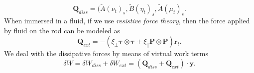 \documentclass[12pt]{article}
\begin{document}
\[
\mathbf{Q}_{diss}= (\tilde{A}(\nu_t)_s,\tilde{B}(\eta_t)_s,\tilde{A}(\mu_t)_s.
\]
When immersed in a fluid, if we use \emph{resistive force theory},
then the force applied by fluid on the rod can be modeled as
\[\mathbf{Q}_{ext} = -( \xi_\perp \mathbf{\tau}\otimes\mathbf{\tau} + \xi_\parallel \mathbf{P}\otimes \mathbf{P}) \mathbf{r}_t.\]
We deal with the dissipative forces by means of virtual work terms
\[\delta W = \delta W_{diss} + \delta W_{ext} = (\mathbf{Q}_{diss}+\mathbf{Q}_{ext})\cdot\mathbf{y}.\]
\end{document}
